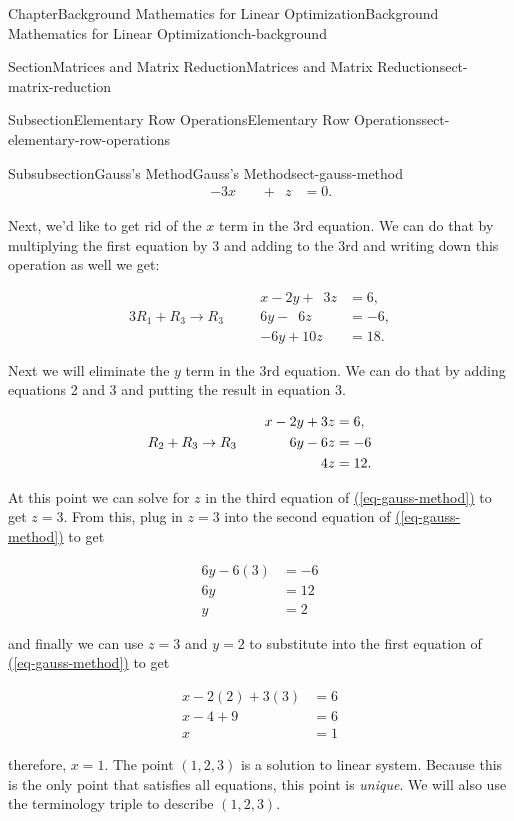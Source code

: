 \documentclass[oneside,10pt,]{book}
\newcommand{\xreffont}{\relax}
\numberwithin{equation}{section}
\newcommand{\amp}{&}
\begin{document}
\begin{chapterptx}{Chapter}{Background Mathematics for Linear Optimization}{}{Background Mathematics for Linear Optimization}{}{}{ch-background}
\begin{sectionptx}{Section}{Matrices and Matrix Reduction}{}{Matrices and Matrix Reduction}{}{}{sect-matrix-reduction}
\begin{subsectionptx}{Subsection}{Elementary Row Operations}{}{Elementary Row Operations}{}{}{sect-elementary-row-operations}
\begin{subsubsectionptx}{Subsubsection}{Gauss's Method}{}{Gauss's Method}{}{}{sect-gauss-method}
\begin{align*}
\amp \amp -3x \phantom{+2y}+\phantom{3} z \amp = 0.
\end{align*}
%
\par
Next, we'd like to get rid of the \(x\) term in the 3rd equation. We can do that by multiplying the first equation by 3 and adding to the 3rd and writing down this operation as well we get:%
\par
%
\begin{align*}
\amp \amp x -2y + \phantom{1}3z \amp = 6, \\
3R_1+R_3 \rightarrow R_3\quad \amp \amp 6 y-\phantom{1}6z \amp = -6, \\
\amp \amp -6y+10z \amp = 18.
\end{align*}
%
\par
Next we will eliminate the \(y\) term in the 3rd equation. We can do that by adding equations 2 and 3 and putting the result in equation 3.%
\par
%
\begin{align}
\amp \amp x -2y + 3z \amp = 6, \notag\\
R_2+R_3 \rightarrow R_3\quad \amp \amp 6 y-6z \amp = -6 \label{eq-gauss-method}\\
\amp \amp 4z \amp = 12. \notag
\end{align}
%
\par
At this point we can solve for \(z\) in the third equation of \hyperref[eq-gauss-method]{({\xreffont\ref{eq-gauss-method}})} to get \(z=3\). From this, plug in \(z=3\) into the second equation of \hyperref[eq-gauss-method]{({\xreffont\ref{eq-gauss-method}})} to get%
\par
%
\begin{align*}
6y -6(3) \amp = -6 \\
6y \amp = 12 \\
y \amp = 2
\end{align*}
%
\par
and finally we can use \(z=3\) and \(y=2\) to substitute into the first equation of \hyperref[eq-gauss-method]{({\xreffont\ref{eq-gauss-method}})} to get%
\par
%
\begin{align*}
x-2(2)+3(3)\amp = 6 \\
x-4+9\amp = 6 \\
x \amp = 1
\end{align*}
%
\par
therefore, \(x=1\). The point \((1,2,3)\) is a solution to linear system. Because this is the only point that satisfies all equations, this point is \emph{unique}. We will also use the terminology triple to describe \((1,2,3)\).%

\end{subsubsectionptx}
\end{subsectionptx}
\end{sectionptx}
\end{chapterptx}
\end{document}
